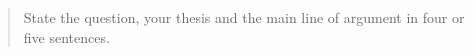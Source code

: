 \documentclass[12pt,a4paper]{article}
\begin{document}
\atlmaketitle

\begin{abstract}
State the question, your thesis and the main line of argument in four or five sentences.
\end{abstract}





\end{document}
